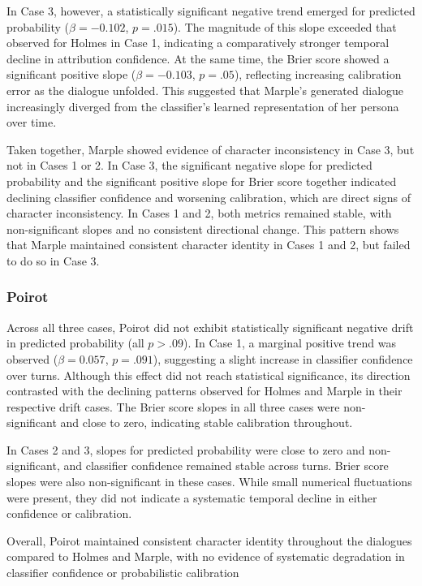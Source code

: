 \documentclass{article}
\begin{document}
In Case 3, however, a statistically significant negative trend emerged for predicted probability ($\beta=-0.102$, $p=.015$). The magnitude of this slope exceeded that observed for Holmes in Case 1, indicating a comparatively stronger temporal decline in attribution confidence. At the same time, the Brier score showed a significant positive slope ($\beta=-0.103$, $p=.05$), reflecting increasing calibration error as the dialogue unfolded. This suggested that Marple's generated dialogue increasingly diverged from the classifier's learned representation of her persona over time.

Taken together, Marple showed evidence of character inconsistency in Case 3, but not in Cases 1 or 2. In Case 3, the significant negative slope for predicted probability and the significant positive slope for Brier score together indicated declining classifier confidence and worsening calibration, which are direct signs of character inconsistency. In Cases 1 and 2, both metrics remained stable, with non-significant slopes and no consistent directional change. This pattern shows that Marple maintained consistent character identity in Cases 1 and 2, but failed to do so in Case 3.

\subsubsection{Poirot} \label{sec:results_classifier_poirot}

Across all three cases, Poirot did not exhibit statistically significant negative drift in predicted probability (all $p>.09$). In Case 1, a marginal positive trend was observed ($\beta=0.057$, $p=.091$), suggesting a slight increase in classifier confidence over turns. Although this effect did not reach statistical significance, its direction contrasted with the declining patterns observed for Holmes and Marple in their respective drift cases. The Brier score slopes in all three cases were non-significant and close to zero, indicating stable calibration throughout.

In Cases 2 and 3, slopes for predicted probability were close to zero and non-significant, and classifier confidence remained stable across turns. Brier score slopes were also non-significant in these cases. While small numerical fluctuations were present, they did not indicate a systematic temporal decline in either confidence or calibration.

Overall, Poirot maintained consistent character identity throughout the dialogues compared to Holmes and Marple, with no evidence of systematic degradation in classifier confidence or probabilistic calibration
\end{document}
